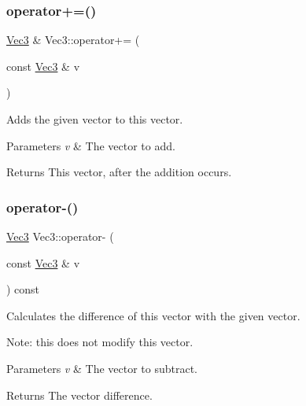 \subsubsection{\texorpdfstring{operator+=()}{operator+=()}\hspace{0.1cm}{\footnotesize\ttfamily [2/2]}}
{\footnotesize\ttfamily \hyperlink{classVec3}{Vec3} \& Vec3\+::operator+= (\begin{DoxyParamCaption}\item[{const \hyperlink{classVec3}{Vec3} \&}]{v }\end{DoxyParamCaption})\hspace{0.3cm}{\ttfamily [inline]}}

Adds the given vector to this vector.


\begin{DoxyParams}{Parameters}
{\em v} & The vector to add. \\
\hline
\end{DoxyParams}
\begin{DoxyReturn}{Returns}
This vector, after the addition occurs. 
\end{DoxyReturn}
\mbox{\label{classVec3_ab16ba241e199e6604928cd5ae66e37d4}} 
\subsubsection{\texorpdfstring{operator-\/()}{operator-()}\hspace{0.1cm}{\footnotesize\ttfamily [1/4]}}
{\footnotesize\ttfamily \hyperlink{classVec3}{Vec3} Vec3\+::operator-\/ (\begin{DoxyParamCaption}\item[{const \hyperlink{classVec3}{Vec3} \&}]{v }\end{DoxyParamCaption}) const\hspace{0.3cm}{\ttfamily [inline]}}

Calculates the difference of this vector with the given vector.

Note\+: this does not modify this vector.


\begin{DoxyParams}{Parameters}
{\em v} & The vector to subtract. \\
\hline
\end{DoxyParams}
\begin{DoxyReturn}{Returns}
The vector difference. 
\end{DoxyReturn}
\mbox{\label{classVec3_ab16ba241e199e6604928cd5ae66e37d4}} 
